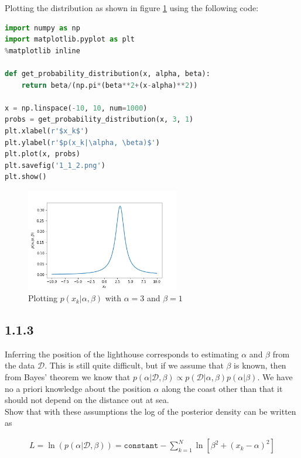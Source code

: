 \documentclass[a4paper]{article}
\begin{document}
Plotting the distribution as shown in figure \ref{fig:112} using the following code:

\begin{lstlisting}[language=Python]
import numpy as np
import matplotlib.pyplot as plt 
%matplotlib inline

def get_probability_distribution(x, alpha, beta):
    return beta/(np.pi*(beta**2+(x-alpha)**2))
    
x = np.linspace(-10, 10, num=1000) 
probs = get_probability_distribution(x, 3, 1) 
plt.xlabel(r'$x_k$')
plt.ylabel(r'$p(x_k|\alpha, \beta)$')
plt.plot(x, probs)
plt.savefig('1_1_2.png')
plt.show()    
\end{lstlisting}

\begin{figure}[H]
\center
\includegraphics[width=0.6\textwidth]{Images/1_1_2.png}
\caption{Plotting $p(x_k | \alpha, \beta)$ with $\alpha = 3$ and $\beta = 1$}
\label{fig:112}
\end{figure}

\subsection*{1.1.3}

Inferring the position of the lighthouse corresponds to estimating $\alpha$ and $\beta$ from the data $\mathcal{D}$. This is still quite difficult, but if we assume that $\beta$ is known, then from Bayes’ theorem we know that $p(\alpha|\mathcal{D}, \beta) \propto p(\mathcal{D}|\alpha, \beta) p(\alpha|\beta)$. We have no a priori knowledge about the position $\alpha$ along the coast other than that it should not depend on the distance out at sea.\\

Show that with these assumptions the log of the posterior density can be written as

\begin{eqnarray}
L = \ln (p(\alpha | \mathcal{D, \beta})) = \texttt{constant} - \sum_{k = 1}^N \ln [\beta^2 + (x_k - \alpha)^2] 
\end{eqnarray}
\end{document}
